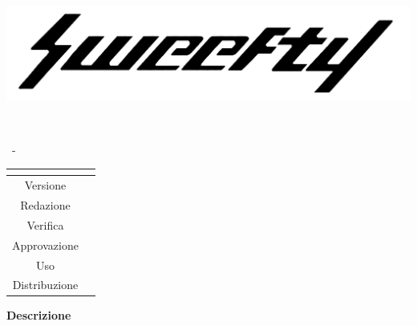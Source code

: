\documentclass[a4paper, oneside, openany]{article}
\begin{document}
\begin{titlepage}
	\begin{center}
		
		\begin{center}
			\centerline{\includegraphics[scale=0.24]{../../../CommonImages/logo.jpg}}
		\end{center}
		
		\vspace{1cm}
		
		\begin{Huge}
			\textbf{\Titolo{}} \\
		\end{Huge}
		
		\vspace{9pt}  
		
		\begin{large}
			\Gruppo{}\ - \Data{}
		\end{large}	  
		
		\vspace{15pt}
		
		\bgroup
		\def\arraystretch{1.3}
		\centering
		\begin{tabular}{c|L{5cm}}
			 \\ \hline
			Versione &  \Versione{}\\
			Redazione & \ACapoRedazione{} \\
			Verifica & \Verifica{} \\ 
			Approvazione & \Approvazione{} \ & \Uso \\
			Distribuzione & \Distribuzione{}
		\end{tabular}
		\egroup
		
		\vspace{15pt}
		
		\begin{center}
			\textbf{Descrizione\\}
			\DescrizioneDoc{}
		\end{center}
		
	\end{center}
\end{titlepage}
\end{document}
